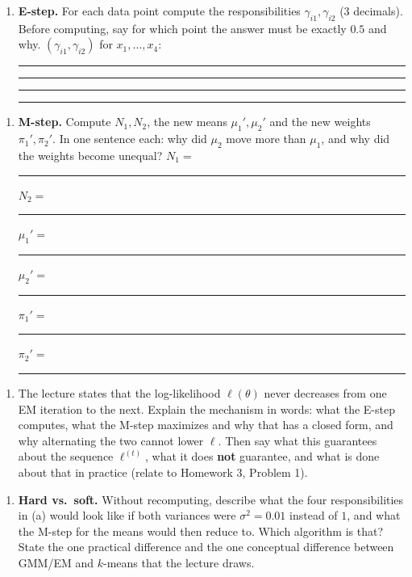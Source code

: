 \documentclass[
  11pt,
]{article}
\providecommand{\tightlist}{%
  \setlength{\itemsep}{0pt}\setlength{\parskip}{0pt}}
\newcommand{\answerspace}[1]{\par\vspace*{#1}}  %
\newcommand{\blank}[1][1.2in]{\rule{#1}{0.4pt}}
\begin{document}
\begin{enumerate}
\def\labelenumi{(\alph{enumi})}
\tightlist
\item
  \textbf{E-step.} For each data point compute the responsibilities
  \(\gamma_{i1}, \gamma_{i2}\) (3 decimals). Before computing, say for
  which point the answer must be exactly \(0.5\) and why.
  \((\gamma_{i1},\gamma_{i2})\) for \(x_1,\dots,x_4\):
  \blank[1in] \blank[1in] \blank[1in] \blank[1in]
\end{enumerate}

\answerspace{2.5in}

\begin{enumerate}
\def\labelenumi{(\alph{enumi})}
\setcounter{enumi}{1}
\tightlist
\item
  \textbf{M-step.} Compute \(N_1, N_2\), the new means
  \(\mu_1', \mu_2'\) and the new weights \(\pi_1', \pi_2'\). In one
  sentence each: why did \(\mu_2\) move more than \(\mu_1\), and why did
  the weights become unequal? \(N_1 =\) \blank[0.5in] \(N_2 =\)
  \blank[0.5in] \(\mu_1' =\) \blank[0.5in] \(\mu_2' =\)
  \blank[0.5in] \(\pi_1' =\) \blank[0.5in] \(\pi_2' =\) \blank[0.5in]
\end{enumerate}

\answerspace{3.4in}

\begin{enumerate}
\def\labelenumi{(\alph{enumi})}
\setcounter{enumi}{2}
\tightlist
\item
  The lecture states that the log-likelihood \(\ell(\theta)\) never
  decreases from one EM iteration to the next. Explain the mechanism in
  words: what the E-step computes, what the M-step maximizes and why
  that has a closed form, and why alternating the two cannot lower
  \(\ell\). Then say what this guarantees about the sequence
  \(\ell^{(t)}\), what it does \textbf{not} guarantee, and what is done
  about that in practice (relate to Homework 3, Problem 1).
\end{enumerate}

\answerspace{2.8in}

\begin{enumerate}
\def\labelenumi{(\alph{enumi})}
\setcounter{enumi}{3}
\tightlist
\item
  \textbf{Hard vs.~soft.} Without recomputing, describe what the four
  responsibilities in (a) would look like if both variances were
  \(\sigma^2 = 0.01\) instead of \(1\), and what the M-step for the
  means would then reduce to. Which algorithm is that? State the one
  practical difference and the one conceptual difference between GMM/EM
  and \(k\)-means that the lecture draws.
\end{enumerate}

\answerspace{2.2in}
\end{document}
